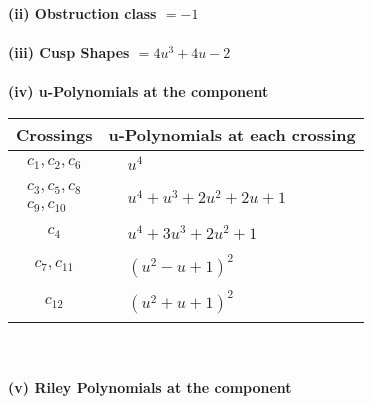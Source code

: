 \documentclass[1p]{elsarticle_modified}
\theoremstyle{definition}
\begin{document}
\flushleft \textbf{(ii) Obstruction class $= -1$}\\~\\
\flushleft \textbf{(iii) Cusp Shapes $= 4 u^3+4 u-2$}\\~\\
\newpage\renewcommand{\arraystretch}{1}
\flushleft \textbf{(iv) u-Polynomials at the component}\newline \\
\begin{tabular}{m{50pt}|m{274pt}}
Crossings & \hspace{64pt}u-Polynomials at each crossing \\
\hline $$\begin{aligned}c_{1},c_{2},c_{6}\end{aligned}$$&$\begin{aligned}
&u^4
\end{aligned}$\\
\hline $$\begin{aligned}c_{3},c_{5},c_{8}\\c_{9},c_{10}\end{aligned}$$&$\begin{aligned}
&u^4+u^3+2 u^2+2 u+1
\end{aligned}$\\
\hline $$\begin{aligned}c_{4}\end{aligned}$$&$\begin{aligned}
&u^4+3 u^3+2 u^2+1
\end{aligned}$\\
\hline $$\begin{aligned}c_{7},c_{11}\end{aligned}$$&$\begin{aligned}
&(u^2- u+1)^2
\end{aligned}$\\
\hline $$\begin{aligned}c_{12}\end{aligned}$$&$\begin{aligned}
&(u^2+u+1)^2
\end{aligned}$\\
\hline
\end{tabular}\\~\\
\newpage\renewcommand{\arraystretch}{1}
\flushleft \textbf{(v) Riley Polynomials at the component}\newline \\
\end{document}
